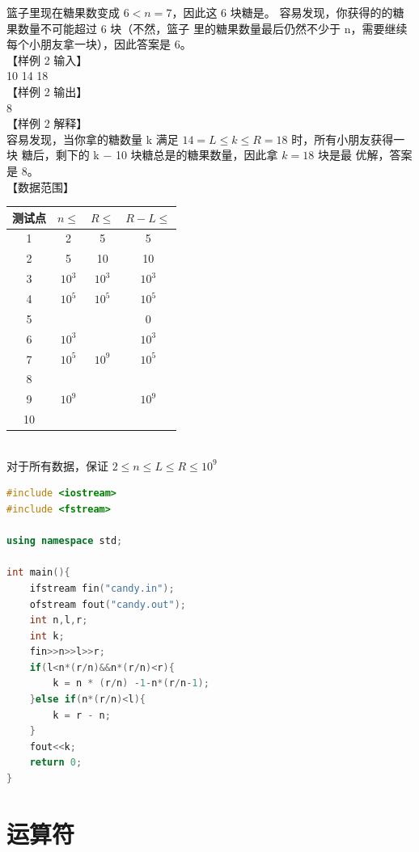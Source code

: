\documentclass[12pt,twiside,a4paper]{ctexbook}
\numberwithin{chapter}{part}
\begin{document}
篮子里现在糖果数变成 $6 < n = 7$，因此这 6 块糖是。
容易发现，你获得的的糖果数量不可能超过 6 块（不然，篮子
里的糖果数量最后仍然不少于 n，需要继续每个小朋友拿一块），因此答案是 6。\\
【样例 2 输入】\\
10 14 18\\
【样例 2 输出】\\
8\\
【样例 2 解释】\\
容易发现，当你拿的糖数量 k 满足 $14 = L \leq k \leq R = 18$ 时，所有小朋友获得一块
糖后，剩下的 k − 10 块糖总是的糖果数量，因此拿 $k = 18$ 块是最
优解，答案是 8。\\
【数据范围】\\
\begin{tabular}{|c|c|c|c|}
  \hline
  测试点 &  $n\leq$ & $R\leq$ & $R-L\leq$\\
  \hline
  1 & 2 & 5 & 5\\
  \hline
  2 & 5 & 10 & 10\\
  \hline
  3 & $10^3$ & $10^3$ & $10^3$\\
  \hline
  4 & $10^5$ & $10^5$ & $10^5$\\
  \hline
  5 & & & 0\\
  \cline{1-1}
  \cline{4-1}
  6 & $10^3$ & & $10^3$\\
  \cline{1-1}
  \cline{2-1}
  \cline{4-1}
  7 & $10^5$ & $10^9$ & $10^5$\\
  \cline{1-1}
  \cline{2-1}
  \cline{4-1}
  8 & & & \\
  \cline{1-1}
  9 & $10^9$ & & $10^{9}$\\
  \cline{1-1}
  10 & & &\\
  \hline
\end{tabular}\\
对于所有数据，保证 $2 \leq n \leq L \leq R \leq 10^9$
\begin{lstlisting}[language=C++]
#include <iostream>
#include <fstream>

using namespace std;

int main(){
	ifstream fin("candy.in");
	ofstream fout("candy.out");
	int n,l,r;
	int k;
	fin>>n>>l>>r;
	if(l<n*(r/n)&&n*(r/n)<r){
		k = n * (r/n) -1-n*(r/n-1);
	}else if(n*(r/n)<l){
		k = r - n;
	}
	fout<<k;
	return 0;
}
\end{lstlisting}

\chapter{运算符}
\end{document}
